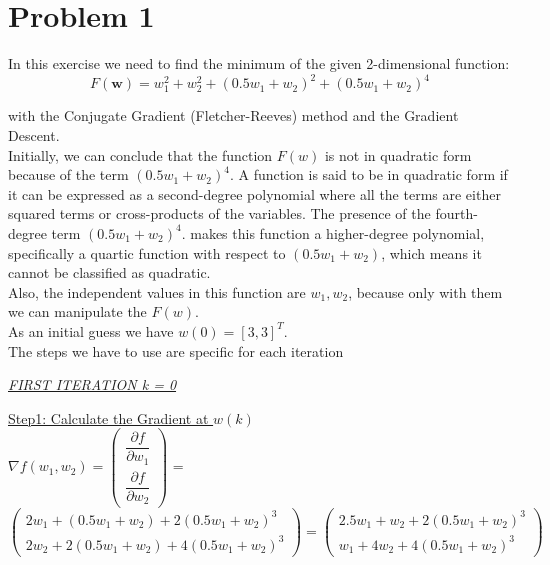\section{Problem 1}
In this exercise we need to find the minimum of the given 2-dimensional function:\\
\begin{equation}	
		F(\mathbf{w})=w_{1}^{2}+w_{2}^{2}+(0.5w_{1}+w_{2})^{2}+(0.5w_{1}+w_{2})^{4}	
		\label{eq:function1}
\end{equation}

with the Conjugate Gradient (Fletcher-Reeves) method and the Gradient Descent.\\

Initially, we can conclude that the function $F(w)$ is not in quadratic form because of the term $(0.5w_{1}+w_{2})^{4}$.
A function is said to be in quadratic form if it can be expressed as a second-degree polynomial where all the terms are either squared terms or cross-products of the variables. The presence of the fourth-degree term $(0.5w_{1}+w_{2})^{4}$.
makes this function a higher-degree polynomial, specifically a quartic function with respect to $(0.5w_{1}+w_{2})$, which means it cannot be classified as quadratic.\\
Also, the independent values in this function are $w_{1},w_{2}$, because only with them we can manipulate the $F(w)$.\\ 

As an initial guess we have $w\left(0\right) = \left[3, 3\right]^T$.\\
Τhe steps we have to use are specific for each iteration

\begin{center}
	\underline{\textit{FIRST ITERATION k = 0}}
\end{center}

\underline{Step1: Calculate the Gradient at  $w\left(k\right)$ }\\
\(\nabla f(w_1,w_2) = \left(\begin{array}{c}
	\dfrac{\partial f}{\partial w_1} \\[4mm]
	\dfrac{\partial f}{\partial w_2}
\end{array}\right)\) = $\left(\begin{array}{c}
	2w_1 + (0.5w_1+w_2) + 2(0.5w_1+w_2)^3\\[1mm]
	2w_2 + 2(0.5w_1+w_2) + 4(0.5w_1+w_2)^3
\end{array}\right) = \left(\begin{array}{c}
	2.5w_1 + w_2 + 2(0.5w_1+w_2)^3\\[1mm]
	w_1 + 4w_2 + 4(0.5w_1+w_2)^3
\end{array}\right)$ \\[3mm]

